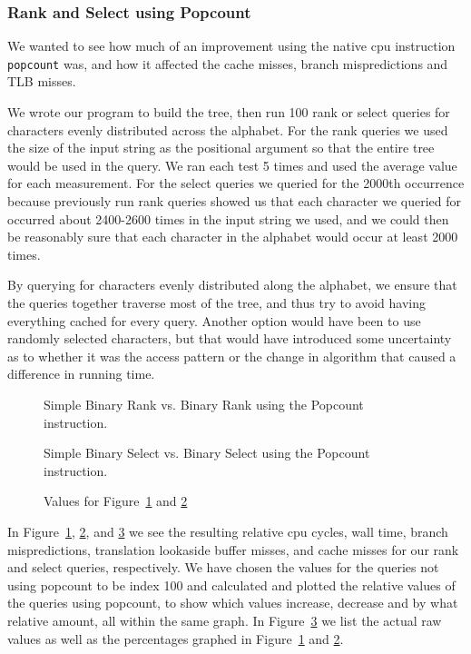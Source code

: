 \subsubsection{Rank and Select using Popcount}
\label{sec:experimentPopcountRankSelect}
We wanted to see how much of an improvement using the native cpu instruction \texttt{popcount} was, and how it affected the cache misses, branch mispredictions and TLB misses.

We wrote our program to build the tree, then run 100 rank or select queries for characters evenly distributed across the alphabet.
For the rank queries we used the size of the input string as the positional argument so that the entire tree would be used in the query.
We ran each test 5 times and used the average value for each measurement.
For the select queries we queried for the 2000th occurrence because previously run rank queries showed us that each character we queried for occurred about 2400-2600 times in the input string we used, and we could then be reasonably sure that each character in the alphabet would occur at least 2000 times.

By querying for characters evenly distributed along the alphabet, we ensure that the queries together traverse most of the tree, and thus try to avoid having everything cached for every query. Another option would have been to use randomly selected characters, but that would have introduced some uncertainty as to whether it was the access pattern or the change in algorithm that caused a difference in running time.



\begin{figure}
\caption{Simple Binary Rank vs. Binary Rank using the Popcount instruction.}
\label{fig:rankPopcountDiff}

\end{figure}

\begin{figure}
\caption{Simple Binary Select vs. Binary Select using the Popcount instruction.}
\label{fig:selectPopcountDiff}

\end{figure}

\begin{figure}
\center
\caption{Values for Figure~\ref{fig:rankPopcountDiff} and \ref{fig:selectPopcountDiff}}
\label{fig:valuesForPopcountDiff}

\end{figure}

In Figure~\ref{fig:rankPopcountDiff}, \ref{fig:selectPopcountDiff}, and \ref{fig:valuesForPopcountDiff} we see the resulting relative cpu cycles, wall time, branch mispredictions, translation lookaside buffer misses, and cache misses for our rank and select queries, respectively.
We have chosen the values for the queries not using popcount to be index 100 and calculated and plotted the relative values of the queries using popcount, to show which values increase, decrease and by what relative amount, all within the same graph.
In Figure~\ref{fig:valuesForPopcountDiff} we list the actual raw values as well as the percentages graphed in Figure~\ref{fig:rankPopcountDiff} and \ref{fig:selectPopcountDiff}.

